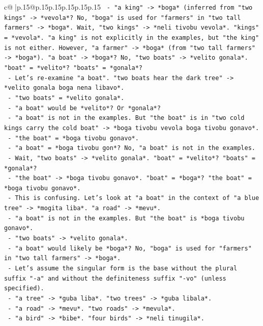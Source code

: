 \documentclass{article}
\begin{document}
{\begin{supertabular}{c@{$\;$}|p{.15\linewidth}@{}p{.15\linewidth}p{.15\linewidth}p{.15\linewidth}p{.15\linewidth}p{.15\linewidth}}
{{{\texttt{  {-} "a king" {-}> *boga* (inferred from "two kings" {-}> *vevola*? No, "boga" is used for "farmers" in "two tall farmers" {-}> *boga*. Wait, "two kings" {-}> *neli tivobu vevola*. "kings" = *vevola*. "a king" is not explicitly in the examples, but "the king" is not either. However, "a farmer" {-}> *boga* (from "two tall farmers" {-}> *boga*). "a boat" {-}> *boga*? No, "two boats" {-}> *velito gonala*. "boat" = *velito*? "boats" = *gonala*?} \\
\texttt{  {-} Let's re{-}examine "a boat". "two boats hear the dark tree" {-}> *velito gonala boga nena libavo*.} \\
\texttt{    {-} "two boats" = *velito gonala*.} \\
\texttt{    {-} "a boat" would be *velito*? Or *gonala*?} \\
\texttt{    {-} "a boat" is not in the examples. But "the boat" is in "two cold kings carry the cold boat" {-}> *boga tivobu vevola boga tivobu gonavo*.} \\
\texttt{      {-} "the boat" = *boga tivobu gonavo*.} \\
\texttt{      {-} "a boat" = *boga tivobu gon*? No, "a boat" is not in the examples.} \\
\texttt{      {-} Wait, "two boats" {-}> *velito gonala*. "boat" = *velito*? "boats" = *gonala*?} \\
\texttt{      {-} "the boat" {-}> *boga tivobu gonavo*. "boat" = *boga*? "the boat" = *boga tivobu gonavo*.} \\
\texttt{      {-} This is confusing. Let's look at "a boat" in the context of "a blue tree" {-}> *mogita liba*. "a road" {-}> *mevu*.} \\
\texttt{      {-} "a boat" is not in the examples. But "the boat" is *boga tivobu gonavo*.} \\
\texttt{      {-} "two boats" {-}> *velito gonala*.} \\
\texttt{      {-} "a boat" would likely be *boga*? No, "boga" is used for "farmers" in "two tall farmers" {-}> *boga*.} \\
\texttt{      {-} Let's assume the singular form is the base without the plural suffix "{-}a" and without the definiteness suffix "{-}vo" (unless specified).} \\
\texttt{      {-} "a tree" {-}> *guba liba*. "two trees" {-}> *guba libala*.} \\
\texttt{      {-} "a road" {-}> *mevu*. "two roads" {-}> *mevula*.} \\
\texttt{      {-} "a bird" {-}> *bibe*. "four birds" {-}> *neli tinugila*.} \\
}}}
\end{supertabular}}
\end{document}

